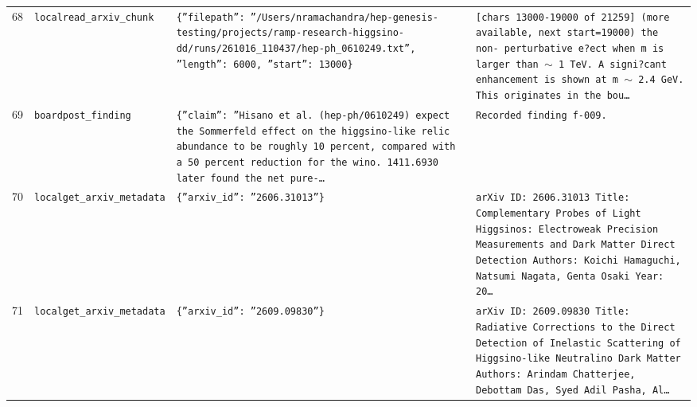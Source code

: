 \documentclass[11pt,a4paper]{article}
\begin{document}
\begin{longtable}{@{}p{}p{}p{}p{}@{}}
68 & \texttt{local}\newline\texttt{read\_\allowbreak{}arxiv\_\allowbreak{}chunk} & \texttt{\{''filepath'':\allowbreak{} ''/\allowbreak{}Users/\allowbreak{}nramachandra/\allowbreak{}hep-genesis-testing/\allowbreak{}projects/\allowbreak{}ramp-research-higgsino-dd/\allowbreak{}runs/\allowbreak{}261016\_\allowbreak{}110437/\allowbreak{}hep-ph\_\allowbreak{}0610249.txt'',\allowbreak{} ''length'':\allowbreak{} 6000,\allowbreak{} ''start'':\allowbreak{} 13000\}\allowbreak{}} & \texttt{[chars 13000-19000 of 21259]\allowbreak{} (more available,\allowbreak{} next start=\allowbreak{}19000)\allowbreak{}  the non- perturbative e?ect when m is larger than $\sim$ 1 TeV. A signi?cant enhancement is shown at m $\sim$ 2.4 GeV. This originates in the bou\ldots{}\allowbreak{}} \\
69 & \texttt{board}\newline\texttt{post\_\allowbreak{}finding} & \texttt{\{''claim'':\allowbreak{} ''Hisano et al. (hep-ph/\allowbreak{}0610249)\allowbreak{} expect the Sommerfeld effect on the higgsino-like relic abundance to be roughly 10 percent,\allowbreak{} compared with a 50 percent reduction for the wino. 1411.6930 later found the net pure-\ldots{}\allowbreak{}} & \texttt{Recorded finding f-009.} \\
70 & \texttt{local}\newline\texttt{get\_\allowbreak{}arxiv\_\allowbreak{}metadata} & \texttt{\{''arxiv\_\allowbreak{}id'':\allowbreak{} ''2606.31013''\}\allowbreak{}} & \texttt{arXiv ID:\allowbreak{} 2606.31013 Title:\allowbreak{} Complementary Probes of Light Higgsinos:\allowbreak{} Electroweak Precision Measurements and Dark Matter Direct Detection Authors:\allowbreak{} Koichi Hamaguchi,\allowbreak{} Natsumi Nagata,\allowbreak{} Genta Osaki Year:\allowbreak{} 20\ldots{}\allowbreak{}} \\
71 & \texttt{local}\newline\texttt{get\_\allowbreak{}arxiv\_\allowbreak{}metadata} & \texttt{\{''arxiv\_\allowbreak{}id'':\allowbreak{} ''2609.09830''\}\allowbreak{}} & \texttt{arXiv ID:\allowbreak{} 2609.09830 Title:\allowbreak{} Radiative Corrections to the Direct Detection of Inelastic Scattering of Higgsino-like Neutralino Dark Matter Authors:\allowbreak{} Arindam Chatterjee,\allowbreak{} Debottam Das,\allowbreak{} Syed Adil Pasha,\allowbreak{} Al\ldots{}\allowbreak{}} \\

\end{longtable}
\end{document}
